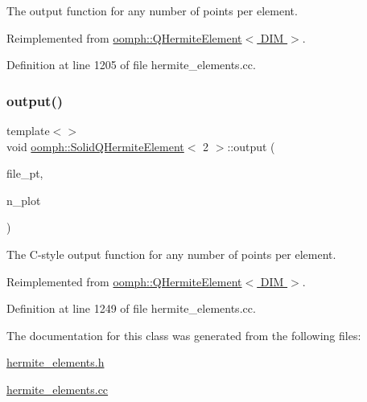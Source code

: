 The output function for any number of points per element. 



Reimplemented from \hyperlink{classoomph_1_1QHermiteElement_a8053b3b58ea769a5e7be72982d594c0d}{oomph\+::\+Q\+Hermite\+Element$<$ D\+I\+M $>$}.



Definition at line 1205 of file hermite\+\_\+elements.\+cc.

\mbox{\label{classoomph_1_1SolidQHermiteElement_aabd23592071d29249154d7cde20f2d88}} 
\subsubsection{\texorpdfstring{output()}{output()}\hspace{0.1cm}{\footnotesize\ttfamily [8/8]}}
{\footnotesize\ttfamily template$<$$>$ \\
void \hyperlink{classoomph_1_1SolidQHermiteElement}{oomph\+::\+Solid\+Q\+Hermite\+Element}$<$ 2 $>$\+::output (\begin{DoxyParamCaption}\item[{F\+I\+LE $\ast$}]{file\+\_\+pt,  }\item[{const unsigned \&}]{n\+\_\+plot }\end{DoxyParamCaption})\hspace{0.3cm}{\ttfamily [virtual]}}



The C-\/style output function for any number of points per element. 



Reimplemented from \hyperlink{classoomph_1_1QHermiteElement_a12a4346480e45d82cbfca1f324cd4878}{oomph\+::\+Q\+Hermite\+Element$<$ D\+I\+M $>$}.



Definition at line 1249 of file hermite\+\_\+elements.\+cc.



The documentation for this class was generated from the following files\+:\begin{DoxyCompactItemize}
\item 
\hyperlink{hermite__elements_8h}{hermite\+\_\+elements.\+h}\item 
\hyperlink{hermite__elements_8cc}{hermite\+\_\+elements.\+cc}\end{DoxyCompactItemize}
